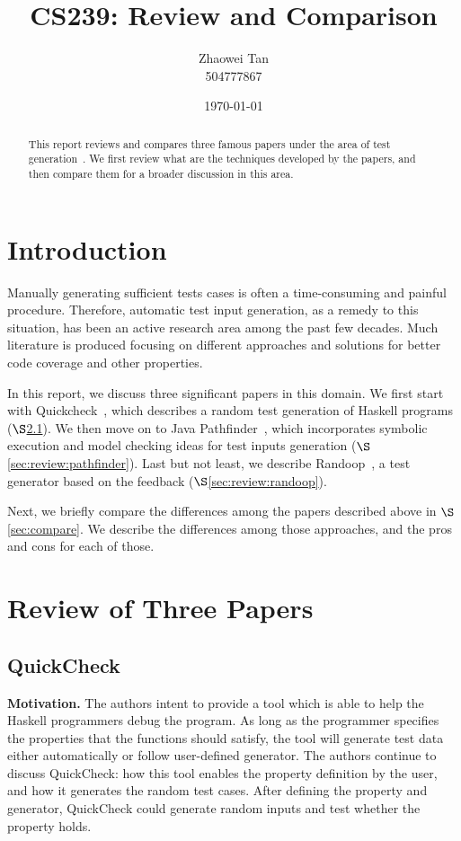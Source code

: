 \documentclass[12pt]{article}
\title{CS239: Review and Comparison}
\author{Zhaowei Tan\\504777867}
\date{\today}
\begin{document}
	
\maketitle

\begin{abstract}
This report reviews and compares three famous papers under the area of test generation~\cite{visser2004test, claessen2011quickcheck, pacheco2007feedback}. We first review what are the techniques developed by the papers, and then compare them for a broader discussion in this area.
\end{abstract}

\section{Introduction}
\label{sec:introduction}
Manually generating sufficient tests cases is often a time-consuming and painful procedure. Therefore, automatic test input generation, as a remedy to this situation, has been an active research area among the past few decades. Much literature is produced focusing on different approaches and solutions for better code coverage and other properties.

In this report, we discuss three significant papers in this domain. We first start with Quickcheck~\cite{claessen2011quickcheck}, which describes a random test generation of Haskell programs ($\S$\ref{sec:review:quickcheck}). We then move on to Java Pathfinder~\cite{visser2004test}, which incorporates symbolic execution and model checking ideas for test inputs generation ($\S$\ref{sec:review:pathfinder}). Last but not least, we describe Randoop~\cite{pacheco2007feedback}, a test generator based on the feedback ($\S$\ref{sec:review:randoop}).

Next, we briefly compare the differences among the papers described above in $\S$\ref{sec:compare}. We describe the differences among those approaches, and the pros and cons for each of those.

\section{Review of Three Papers}
\label{sec:review}

\subsection{QuickCheck}
\label{sec:review:quickcheck}

\textbf{Motivation.}
The authors intent to provide a tool which is able to help the Haskell programmers debug the program. As long as the programmer specifies the properties that the functions should satisfy, the tool will generate test data either automatically or follow user-defined generator. The authors continue to discuss QuickCheck: how this tool enables the property definition by the user, and how it generates the random test cases. After defining the property and generator, QuickCheck could generate random inputs and test whether the property holds.
\end{document}
